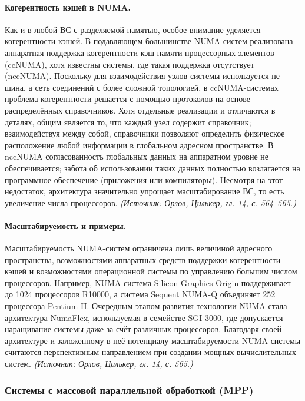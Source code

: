 \documentclass[a4paper,12pt]{article}
\begin{document}
\paragraph{Когерентность кэшей в NUMA.}
Как и в любой ВС с разделяемой памятью, особое внимание уделяется когерентности кэшей. В подавляющем большинстве NUMA-систем реализована аппаратная поддержка когерентности кэш-памяти процессорных элементов (ccNUMA), хотя известны системы, где такая поддержка отсутствует (nccNUMA). Поскольку для взаимодействия узлов системы используется не шина, а сеть соединений с более сложной топологией, в ccNUMA-системах проблема когерентности решается с помощью протоколов на основе распределённых справочников. Хотя отдельные реализации и отличаются в деталях, общим является то, что каждый узел содержит справочник; взаимодействуя между собой, справочники позволяют определить физическое расположение любой информации в глобальном адресном пространстве. В nccNUMA согласованность глобальных данных на аппаратном уровне не обеспечивается; забота об использовании таких данных полностью возлагается на программное обеспечение (приложения или компиляторы). Несмотря на этот недостаток, архитектура значительно упрощает масштабирование ВС, то есть увеличение числа процессоров.
\textit{(Источник: Орлов, Цилькер, гл. 14, с. 564--565.)}

\paragraph{Масштабируемость и примеры.}
Масштабируемость NUMA-систем ограничена лишь величиной адресного пространства, возможностями аппаратных средств поддержки когерентности кэшей и возможностями операционной системы по управлению большим числом процессоров. Например, NUMA-система Silicon Graphics Origin поддерживает до 1024 процессоров R10000, а система Sequent NUMA-Q объединяет 252 процессора Pentium II. Очередным этапом развития технологии NUMA стала архитектура NumaFlex, используемая в семействе SGI 3000, где допускается наращивание системы даже за счёт различных процессоров. Благодаря своей архитектуре и заложенному в неё потенциалу масштабируемости NUMA-системы считаются перспективным направлением при создании мощных вычислительных систем.
\textit{(Источник: Орлов, Цилькер, гл. 14, с. 565.)}

\subsubsection{Системы с массовой параллельной обработкой (MPP)}
\end{document}
